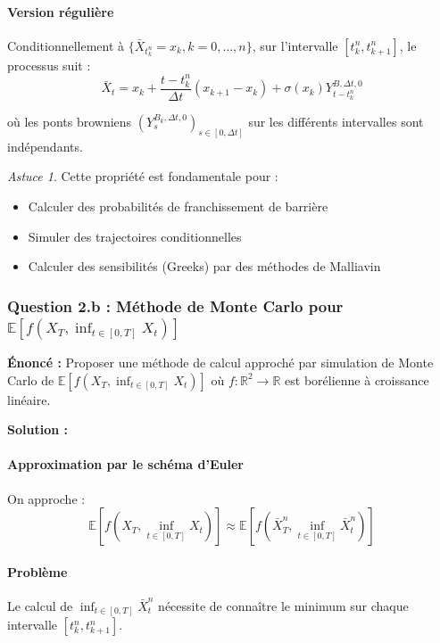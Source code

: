 \documentclass[12pt,a4paper]{article}
\theoremstyle{definition}
\theoremstyle{remark}
\newtheorem*{astuce}{Astuce}
\newcommand{\R}{\mathbb{R}}
\newcommand{\E}{\mathbb{E}}
\begin{document}
\paragraph{Version régulière}

Conditionnellement à $\{\bar{X}_{t_k^n} = x_k, k=0,\ldots,n\}$, sur l'intervalle $[t_k^n, t_{k+1}^n]$, le processus suit :
\[
\bar{X}_t = x_k + \frac{t - t_k^n}{\Delta t}(x_{k+1} - x_k) + \sigma(x_k)Y_{t-t_k^n}^{B,\Delta t, 0}
\]

où les ponts browniens $(Y_s^{B_k,\Delta t, 0})_{s \in [0,\Delta t]}$ sur les différents intervalles sont indépendants.

\begin{astuce}
Cette propriété est fondamentale pour :
\begin{itemize}
\item Calculer des probabilités de franchissement de barrière
\item Simuler des trajectoires conditionnelles
\item Calculer des sensibilités (Greeks) par des méthodes de Malliavin
\end{itemize}
\end{astuce}

\subsubsection{Question 2.b : Méthode de Monte Carlo pour $\E[f(X_T, \inf_{t \in [0,T]} X_t)]$}

\textbf{Énoncé :} Proposer une méthode de calcul approché par simulation de Monte Carlo de $\E[f(X_T, \inf_{t \in [0,T]} X_t)]$ où $f : \R^2 \to \R$ est borélienne à croissance linéaire.

\textbf{Solution :}

\paragraph{Approximation par le schéma d'Euler}

On approche :
\[
\E[f(X_T, \inf_{t \in [0,T]} X_t)] \approx \E[f(\bar{X}_T^n, \inf_{t \in [0,T]} \bar{X}_t^n)]
\]

\paragraph{Problème}

Le calcul de $\inf_{t \in [0,T]} \bar{X}_t^n$ nécessite de connaître le minimum sur chaque intervalle $[t_k^n, t_{k+1}^n]$.
\end{document}
